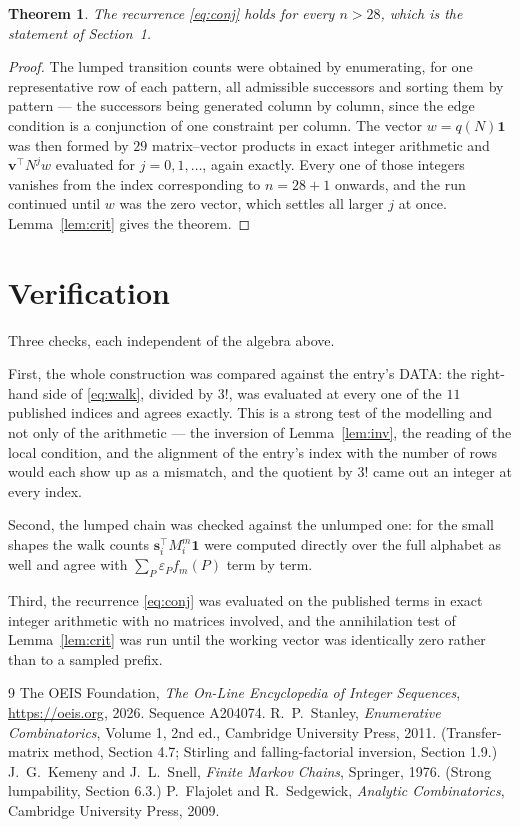 \documentclass[11pt,a4paper]{article}
\theoremstyle{plain}
\newtheorem{theorem}{Theorem}
\theoremstyle{definition}
\begin{document}
\begin{theorem}
The recurrence \eqref{eq:conj} holds for every $n>28$, which is the statement of
Section~1.
\end{theorem}

\begin{proof}
The lumped transition counts were obtained by enumerating, for one representative row of
each pattern, all admissible successors and sorting them by pattern --- the successors being
generated column by column, since the edge condition is a conjunction of one constraint per
column. The vector $w=q(N)\mathbf{1}$ was then formed by $29$ matrix--vector products
in exact integer arithmetic and $\mathbf{v}^{\!\top}N^{j}w$ evaluated for
$j=0,1,\dots$, again exactly. Every one of those integers vanishes from the index
corresponding to $n=28+1$ onwards, and the run continued until $w$ was the zero vector,
which settles all larger $j$ at once. Lemma~\ref{lem:crit} gives the theorem.
\end{proof}

\section{Verification}

Three checks, each independent of the algebra above.

First, the whole construction was compared against the entry's DATA: the right-hand side of
\eqref{eq:walk}, divided by $3!$, was evaluated at every one of the $11$
published indices and agrees exactly. This is a strong test of the modelling and not only of
the arithmetic --- the inversion of Lemma~\ref{lem:inv}, the reading of the local
condition, and the alignment of the entry's index with the number of rows would each
show up as a mismatch, and the quotient by $3!$ came out an integer at every index.

Second, the lumped chain was checked against the unlumped one: for the small shapes the walk
counts $\mathbf{s}_i^{\!\top}M_i^{m}\mathbf{1}$ were computed directly over the full
alphabet as well and agree with $\sum_P\varepsilon_Pf_m(P)$ term by term.

Third, the recurrence \eqref{eq:conj} was evaluated on the published terms in exact integer
arithmetic with no matrices involved, and the annihilation test of Lemma~\ref{lem:crit} was
run until the working vector was identically zero rather than to a sampled prefix.

\begin{thebibliography}{9}
 The OEIS Foundation, \emph{The On-Line Encyclopedia of Integer
Sequences}, \url{https://oeis.org}, 2026. Sequence A204074.
 R.~P.~Stanley, \emph{Enumerative Combinatorics}, Volume 1, 2nd ed.,
Cambridge University Press, 2011. (Transfer-matrix method, Section 4.7; Stirling and
falling-factorial inversion, Section 1.9.)
 J.~G.~Kemeny and J.~L.~Snell, \emph{Finite Markov Chains}, Springer,
1976. (Strong lumpability, Section 6.3.)
 P.~Flajolet and R.~Sedgewick, \emph{Analytic Combinatorics}, Cambridge
University Press, 2009.
\end{thebibliography}
\end{document}
